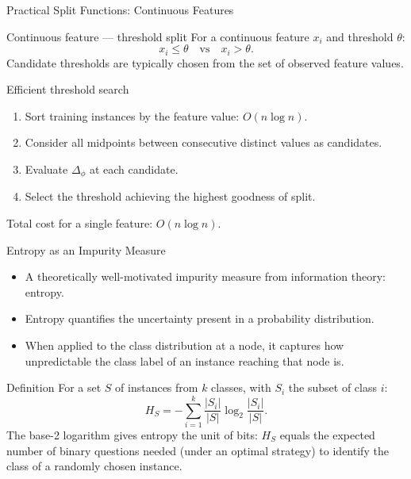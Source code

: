 \begin{frame}{Practical Split Functions: Continuous Features}
  \begin{block}{Continuous feature — threshold split}
    For a continuous feature $x_i$ and threshold $\theta$:
    \[
      x_i \leq \theta \quad \text{vs} \quad x_i > \theta.
    \]
    Candidate thresholds are typically chosen from the \alert{set of observed feature values}.
  \end{block}
  \vspace{0.4em}
  \begin{block}{Efficient threshold search}
    \begin{enumerate}
      \item Sort training instances by the feature value: $O(n \log n)$.
      \item Consider all midpoints between consecutive distinct values as candidates.
      \item Evaluate $\Delta_\phi$ at each candidate.
      \item Select the threshold achieving the highest goodness of split.
    \end{enumerate}
    Total cost for a single feature: $O(n \log n)$.
  \end{block}
\end{frame}

\begin{frame}{Entropy as an Impurity Measure}
  \begin{itemize}
    \item A theoretically well-motivated impurity measure from \alert{information theory}: entropy.
    \item Entropy quantifies the \alert{uncertainty} present in a probability distribution.
    \item When applied to the class distribution at a node, it captures how unpredictable the
          class label of an instance reaching that node is.
  \end{itemize}
  \begin{block}{Definition}
    For a set $S$ of instances from $k$ classes, with $S_i$ the subset of class $i$:
    \[
      H_S = -\sum_{i=1}^{k} \frac{|S_i|}{|S|} \log_2 \frac{|S_i|}{|S|}.
    \]
    The base-2 logarithm gives entropy the unit of \alert{bits}: $H_S$ equals the expected number
    of binary questions needed (under an optimal strategy) to identify the class of a
    randomly chosen instance.
  \end{block}
\end{frame}

